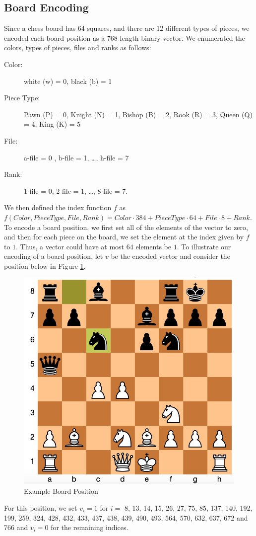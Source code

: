 \documentclass[12pt]{article}
\begin{document}
\subsection{Board Encoding}
Since a chess board has 64 squares, and there are 12 different types of pieces, we encoded each board position as a 768-length binary vector. We enumerated the colors, types of pieces, files and ranks as follows:

\begin{description}
	\item[Color:] white (w) = 0, black (b) = 1
	\item[Piece Type:] Pawn (P) = 0, Knight (N) = 1, Bishop (B) = 2, Rook (R) = 3, Queen (Q) = 4, King (K) = 5
	\item[File:] a-file = 0 , b-file = 1, \dots, h-file = 7
	\item[Rank:] 1-file = 0, 2-file = 1, \dots, 8-file = 7.
\end{description}

We then defined the index function $f$ as $f(Color, PieceType, File, Rank) = Color \cdot 384 + PieceType \cdot 64 + File \cdot 8 + Rank$. To encode a board position, we first set all of the elements of the vector to zero, and then for each piece on the board, we set the element at the index given by $f$ to $1$. Thus, a vector could have at most $64$ elements be $1$. To illustrate our encoding of a board position, let $v$ be the encoded vector and consider the position below in Figure \ref{f2}.
\begin{figure}[h!]
	\centering
	\caption{Example Board Position} \label{f2}
	\includegraphics[scale=0.4]{board1}
\end{figure}
For this position, we set $v_i = 1$ for $i =$ 8, 13, 14, 15, 26, 27, 75, 85, 137, 140, 192, 199, 259, 324, 428, 432, 433, 437, 438, 439, 490, 493, 564, 570, 632, 637, 672 and 766 and $v_i = 0$ for the remaining indices.
\end{document}
